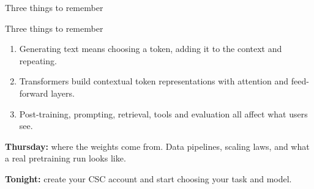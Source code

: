 \documentclass[aspectratio=169,10pt]{beamer}
\begin{document}
\begin{frame}[standout]
  Three things to remember
\end{frame}

\begin{frame}{Three things to remember}
  \begin{enumerate}
    \item {}
      Generating text means choosing a token, adding it to the context and
      repeating.
      \vspace{0.6em}
    \item {}
      Transformers build contextual token representations with attention and
      feed-forward layers.
      \vspace{0.6em}
    \item {} Post-training,
      prompting, retrieval, tools and evaluation all affect what users see.
  \end{enumerate}
  \vfill
  \textbf{Thursday:} where the weights come from. Data pipelines, scaling laws,
  and what a real pretraining run looks like.
  \vspace{0.3em}

  \textbf{Tonight:} create your CSC account and start choosing your task and
  model.
\end{frame}

\appendix
\end{document}
